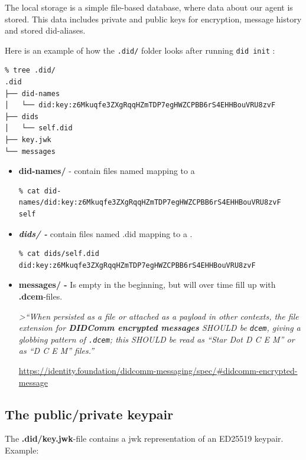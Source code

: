 The local storage is a simple file-based database, where data about our
agent is stored. This data includes private and public keys for
encryption, message history and stored did-aliases.

Here is an example of how the \passthrough{\lstinline!.did/!} folder
looks after running \passthrough{\lstinline!did init!} :

\begin{lstlisting}
% tree .did/
.did
├── did-names
│   └── did:key:z6Mkuqfe3ZXgRqqHZmTDP7egHWZCPBB6rS4EHHBouVRU8zvF
├── dids
│   └── self.did
├── key.jwk
└── messages
\end{lstlisting}

\begin{itemize}
\item
  \textbf{did-names/} - contain files named mapping to a

\begin{lstlisting}
% cat did-names/did:key:z6Mkuqfe3ZXgRqqHZmTDP7egHWZCPBB6rS4EHHBouVRU8zvF 
self
\end{lstlisting}
\item
  \textbf{\emph{dids/ -}} contain files named .did mapping to a .

\begin{lstlisting}
% cat dids/self.did  
did:key:z6Mkuqfe3ZXgRqqHZmTDP7egHWZCPBB6rS4EHHBouVRU8zvF
\end{lstlisting}
\item
  \textbf{messages/ -} Is empty in the beginning, but will over time
  fill up with \textbf{.dcem}-files.

  \emph{\textgreater{}``When persisted as a file or attached as a
  payload in other contexts, the file extension for \textbf{DIDComm
  encrypted messages} SHOULD be \passthrough{\lstinline!dcem!}, giving a
  globbing pattern of \passthrough{\lstinline!.dcem!}; this SHOULD be
  read as ``Star Dot D C E M'' or as ``D C E M'' files.''}

  \url{https://identity.foundation/didcomm-messaging/spec/\#didcomm-encrypted-message}
\end{itemize}

\hypertarget{the-publicprivate-keypair}{%
\subsection{The public/private
keypair}\label{the-publicprivate-keypair}}

The \textbf{.did/key.jwk}-file contains a jwk representation of an
ED25519 keypair. Example:

